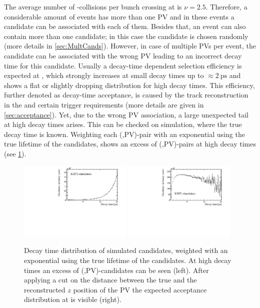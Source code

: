 The average number of \proton\proton-collisions per bunch crossing at \lhcb is $\nu=2.5$.
Therefore, a considerable amount of events has more than one \ac{PV} and in these events a \Bz candidate can be associated with each of them.
Besides that, an event can also contain more than one \Bz candidate; in this case the \Bz candidate is chosen randomly (more details in \cref{sec:MultCands}).
However, in case of multiple \ac{PV}s per event, the \Bz candidate can be associated with the wrong PV leading to an incorrect decay time for this candidate.
Usually a decay-time dependent selection efficiency is expected at \lhcb, which strongly increases at small decay times up to $\approx\SI{2}{\pico\second}$ and shows a flat or slightly dropping distribution for high decay times.
This efficiency, further denoted as decay-time acceptance, is caused by the track reconstruction in the \velo and certain trigger requirements (more details are given in \cref{sec:acceptance}).
Yet, due to the wrong \ac{PV} association, a large unexpected tail at high decay times arises.
This can be checked on simulation, where the true decay time is known.
Weighting each (\Bz,\ac{PV})-pair with an exponential using the true lifetime of the \Bz candidates, shows an excess of (\Bz,\ac{PV})-pairs at high decay times (see \cref{fig:WrongPVMC}).
\begin{figure}[tbp]
    \centering
    \includegraphics[width=0.48\textwidth]{07selection/figs/WrongPVs-weightedBad.pdf}
    \includegraphics[width=0.48\textwidth]{07selection/figs/WrongPVs-weightedGoodMC.pdf}
    \caption{Decay time distribution of simulated \BdToDpi candidates, weighted with an exponential using the true lifetime of the \Bz candidates.
    At high decay times an excess of (\Bz,\ac{PV})-candidates can be seen (left).
    After applying a cut on the distance between the true and the reconstructed $z$ position of the \ac{PV} the expected acceptance distribution at \lhcb is visible (right).}
    \label{fig:WrongPVMC}
\end{figure}
